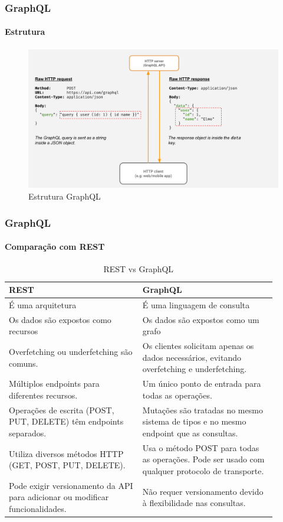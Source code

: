 \documentclass[
	9pt, %
	t, %
]{beamer}
\begin{document}
\begin{frame}
	\frametitle{GraphQL}
	\framesubtitle{Estrutura}

	\begin{figure}
		\includegraphics[width=0.9\linewidth]{graphql.png}
		\caption{Estrutura GraphQL}
		\label{fig:graphql_structure}
	\end{figure}

\end{frame}

\begin{frame}
	\frametitle{GraphQL}
	\framesubtitle{Comparação com REST}

	\begin{table}
		\renewcommand{\arraystretch}{1.25} %
		\begin{tabular}{|p{0.45\linewidth}|p{0.45\linewidth}|}
			\hline
			\textbf{REST} & \textbf{GraphQL} \\ \hline
			É uma arquitetura & É uma linguagem de consulta \\ \hline
			Os dados são expostos como recursos & Os dados são expostos como um grafo \\ \hline
			Overfetching ou underfetching são comuns. & Os clientes solicitam apenas os dados necessários, evitando overfetching e underfetching. \\ \hline
			Múltiplos endpoints para diferentes recursos. & Um único ponto de entrada para todas as operações. \\ \hline
			Operações de escrita (POST, PUT, DELETE) têm endpoints separados. & Mutações são tratadas no mesmo sistema de tipos e no mesmo endpoint que as consultas. \\ \hline
			Utiliza diversos métodos HTTP (GET, POST, PUT, DELETE). & Usa o método POST para todas as operações. Pode ser usado com qualquer protocolo de transporte. \\ \hline
			Pode exigir versionamento da API para adicionar ou modificar funcionalidades. & Não requer versionamento devido à flexibilidade nas consultas. \\ \hline
		\end{tabular}
		\caption{REST vs GraphQL}
		\label{tab:rest_graphql}

	\end{table}

\end{frame}
\end{document}
